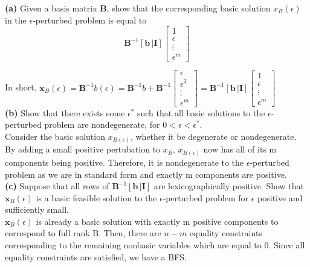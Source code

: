 \documentclass{article}
\begin{document}
\noindent
\textbf{(a)}
Given a basis matrix \textbf{B}, show that the corresponding basic solution $x_B(\epsilon)$ in the $\epsilon$-perturbed problem is equal to
$$
\mathbf{B}^{-1}[\mathbf{b} \, | \mathbf{I}]  \begin{bmatrix}
      1 \\
      \epsilon\\
       \vdots \\
       \epsilon^m 
	\end{bmatrix}
$$


\noindent
In short,
$ \mathbf{x}_B(\epsilon) = \mathbf{B}^{-1}b(\epsilon)=  \mathbf{B}^{-1}b + \mathbf{B}^{-1} \begin{bmatrix}
      \epsilon \\
      \epsilon^2\\
       \vdots \\
       \epsilon^m 
	\end{bmatrix}
= \mathbf{B}^{-1}[\mathbf{b} \, | \mathbf{I}]  \begin{bmatrix}
      1 \\
      \epsilon\\
       \vdots \\
       \epsilon^m 
	\end{bmatrix}$\\


\noindent
\textbf{(b)} 
Show that there exists some $\epsilon^*$ such that all basic solutions to the $\epsilon$-perturbed problem are nondegenerate, for $0 < \epsilon < \epsilon^*$.\\

\noindent
Consider the basic solution $x_{B(\epsilon)}$, whether it be degenerate or nondegenerate.  By adding a small positive pertubation to $x_B$, $x_{B(\epsilon)}$ now has all of its m components being positive.  Therefore, it is nondegenerate to the $\epsilon$-perturbed problem as we are in standard form and exactly m components are positive.\\


\noindent
\textbf{(c)}  Suppose that all rows of $\mathbf{B}^{-1} [\mathbf{b} \, | \mathbf{I}]$ are lexicographically positive.  Show that $\mathbf{x}_B (\epsilon)$ is a basic feasible solution to the $\epsilon$-perturbed problem for $\epsilon$ positive and sufficiently small.\\


\noindent
$\mathbf{x}_B (\epsilon)$ is already a basic solution with exactly m positive components to correspond to full rank B.  Then, there are $n-m$ equality constraints corresponding to the remaining nonbasic variables which are equal to 0.  Since all equality constraints are satisfied, we have a BFS.  \\
\end{document}

